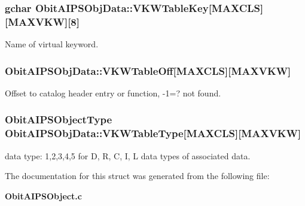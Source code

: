 \subsubsection{\setlength{\rightskip}{0pt plus 5cm}gchar {\bf Obit\-AIPSObj\-Data::VKWTable\-Key}[MAXCLS][MAXVKW][8]}\label{structObitAIPSObjData_o2}


Name of virtual keyword. 

\subsubsection{ {\bf Obit\-AIPSObj\-Data::VKWTable\-Off}[MAXCLS][MAXVKW]}\label{structObitAIPSObjData_o4}


Offset to catalog header entry or function, -1=? not found. 

\subsubsection{\setlength{\rightskip}{0pt plus 5cm}Obit\-AIPSObject\-Type {\bf Obit\-AIPSObj\-Data::VKWTable\-Type}[MAXCLS][MAXVKW]}\label{structObitAIPSObjData_o5}


data type: 1,2,3,4,5 for D, R, C, I, L data types of associated data. 



The documentation for this struct was generated from the following file:\begin{CompactItemize}
\item 
{\bf Obit\-AIPSObject.c}\end{CompactItemize}
